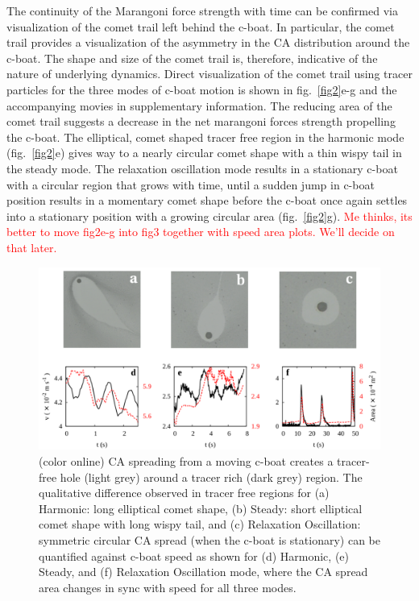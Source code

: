 \documentclass[journal=langd5, manuscript=article, layout=twocolumn]{achemso}
\begin{document}
The continuity of the Marangoni force strength with time can be confirmed via visualization of the comet trail left behind the c-boat. In particular, the comet trail provides a visualization of the asymmetry in the CA distribution around the c-boat. The shape and size of the comet trail is, therefore, indicative of the nature of underlying dynamics. Direct visualization of the comet trail using tracer particles for the three modes of c-boat motion is shown in fig.~\ref{fig2}e-g and the accompanying movies in supplementary information. The reducing area of the comet trail suggests a decrease in the net marangoni forces strength propelling the c-boat. The elliptical, comet shaped tracer free region in the harmonic mode (fig.~\ref{fig2}e) gives way to a nearly circular comet shape with a thin wispy tail in the steady mode. The relaxation oscillation mode results in a stationary c-boat with a circular region that grows with time, until a sudden jump in c-boat position results in a momentary comet shape before the c-boat once again settles into a stationary position with a growing circular area (fig.~\ref{fig2}g). \textcolor{red}{Me thinks, its better to move fig2e-g into fig3 together with speed area plots. We'll decide on that later.}

\begin{figure}[ht] 
    \centering
       \includegraphics[width=\textwidth]{figure3_v2.pdf}
    \caption{(color online) CA spreading from a moving c-boat creates a tracer-free hole (light grey) around a tracer rich (dark grey) region. The qualitative difference observed in tracer free regions for (a) Harmonic: long elliptical comet shape, (b) Steady: short elliptical comet shape with long wispy tail, and (c) Relaxation Oscillation: symmetric circular CA spread (when the c-boat is stationary) can be quantified against c-boat speed as shown for (d) Harmonic, (e) Steady, and (f) Relaxation Oscillation mode, where the CA spread area changes in sync with speed for all three modes. }
    \label{fig3}
\end{figure}
\end{document}
